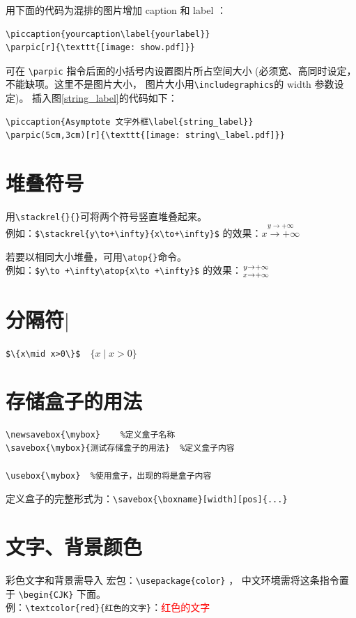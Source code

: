 \documentclass[a4paper,11pt]{article}
\begin{document}
用下面的代码为混排的图片增加 caption 和 label ：
\begin{Verbatim}
\piccaption{yourcaption\label{yourlabel}}
\parpic[r]{\texttt{[image: show.pdf]}}
\end{Verbatim}

可在 \verb+\parpic+ 指令后面的小括号内设置图片所占空间大小%
(必须宽、高同时设定，不能缺项。这里不是图片大小，
图片大小用\verb+\includegraphics+的 width 参数设定)。
插入图\ref{string_label}的代码如下：
\begin{Verbatim}
\piccaption{Asymptote 文字外框\label{string_label}}
\parpic(5cm,3cm)[r]{\texttt{[image: string\_label.pdf]}}
\end{Verbatim}

\section{堆叠符号}
用\verb+\stackrel{}{}+可将两个符号竖直堆叠起来。\\
例如：\verb|$\stackrel{y\to+\infty}{x\to+\infty}$|
的效果：$\stackrel{y\to +\infty}{x\to +\infty}$

若要以相同大小堆叠，可用\verb+\atop{}+命令。\\
例如：\verb|$y\to +\infty\atop{x\to +\infty}$|
的效果：$y\to +\infty\atop{x\to +\infty}$

\section{分隔符$\mid$}
\verb+$\{x\mid x>0\}$+$\quad\{x\mid x>0\}$

\section{存储盒子的用法}
\begin{Verbatim}
\newsavebox{\mybox}    %定义盒子名称
\savebox{\mybox}{测试存储盒子的用法}  %定义盒子内容

\usebox{\mybox}  %使用盒子，出现的将是盒子内容
\end{Verbatim}
定义盒子的完整形式为：\verb+\savebox{\boxname}[width][pos]{...}+

\section{文字、背景颜色}
彩色文字和背景需导入  宏包：\verb+\usepackage{color}+ ，
中文环境需将这条指令置于 \verb+\begin{CJK}+ 下面。\\
例：\verb+\textcolor{red}{红色的文字}+：\textcolor{red}{红色的文字}
\end{document}
